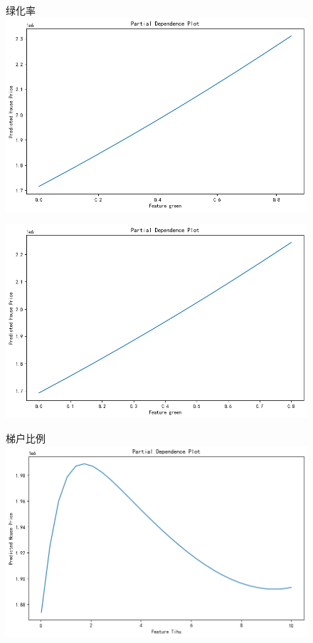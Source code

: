 \documentclass{beamer}
\begin{document}
\begin{frame}
\begin{minipage}[t]{0.32\textwidth}
\begin{figure}
                {\tiny  绿化率}
                \includegraphics[width=\linewidth]{figure/pdp_green_train.png}
            \end{figure}
            \begin{figure}
                \includegraphics[width=\linewidth]{figure/pdp_green_val.png}
            \end{figure}
        \end{minipage}
        \begin{minipage}[t]{0.32\textwidth}
            \begin{figure}
                {\tiny 梯户比例}
                \includegraphics[width=\linewidth]{figure/pdp_tihu_train.png}

\end{figure}
\end{minipage}
\end{frame}
\end{document}
